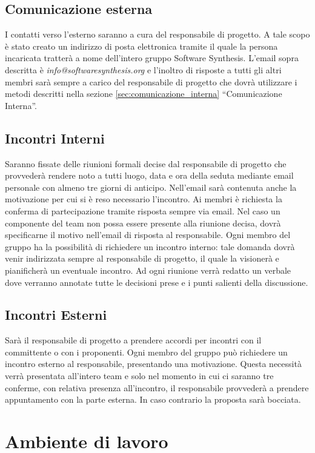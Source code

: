\subsection{Comunicazione esterna}
I contatti verso l'esterno saranno a cura del responsabile di progetto. A tale scopo è stato creato un indirizzo di posta elettronica tramite il quale la persona incaricata tratterà a nome dell'intero gruppo Software Synthesis. L'email sopra descritta è \textit{info@softwaresynthesis.org} e l'inoltro di risposte a tutti gli altri membri sarà sempre a carico del responsabile di progetto che dovrà utilizzare i metodi descritti nella sezione \ref{sec:comunicazione_interna} ``Comunicazione Interna''.

\subsection{Incontri Interni}
Saranno fissate delle riunioni formali decise dal responsabile di progetto che provvederà rendere noto a tutti luogo, data e ora della seduta mediante email personale con almeno tre giorni di anticipo. Nell'email sarà contenuta anche la motivazione per cui si è reso necessario l'incontro. Ai membri è richiesta la conferma di partecipazione tramite risposta sempre via email. Nel caso un componente del team non possa essere presente alla riunione decisa, dovrà specificarne il motivo nell'email di risposta al responsabile.
Ogni membro del gruppo ha la possibilità di richiedere un incontro interno: tale domanda dovrà venir indirizzata sempre al responsabile di progetto, il quale la visionerà e pianificherà un eventuale incontro.
Ad ogni riunione verrà redatto un verbale dove verranno annotate tutte le decisioni prese e i punti salienti della discussione.

\subsection{Incontri Esterni}
Sarà il responsabile di progetto a prendere accordi per incontri con il committente o con i proponenti.
Ogni membro del gruppo può richiedere un incontro esterno al responsabile, presentando una motivazione. Questa necessità verrà presentata all'intero team e solo nel momento in cui ci saranno tre conferme, con relativa presenza all'incontro, il responsabile provvederà a prendere appuntamento con la parte esterna. In caso contrario la proposta sarà bocciata.

\newpage
\section{Ambiente di lavoro}
